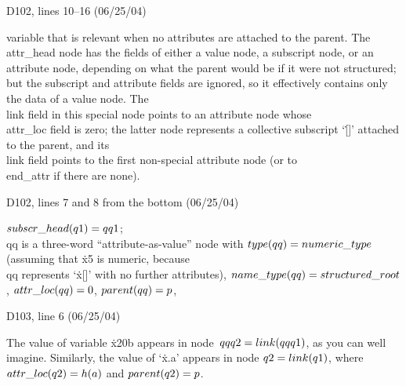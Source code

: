 {{\bugonpage D102, lines 10--16 (06/25/04)

\noindent
variable that is relevant
when no attributes are attached to the parent. The \\{attr\_head} node
has the fields of either
a value node, a subscript node, or an attribute node, depending on what
the parent would be if it were not structured; but the subscript and
attribute fields are ignored, so it effectively contains only the data of
a value node. The \\{link} field in this special node points to an attribute
node whose \\{attr\_loc} field is zero; the latter node represents a collective
subscript `\.{[]}' attached to the parent, and its \\{link} field points to
the first non-special attribute node (or to \\{end\_attr} if there are none).

\bugonpage D102, lines 7 and 8 from the bottom (06/25/04)

\noindent
$\\{subscr\_head}(\\{q1})=\\{qq1}$;
\\{qq} is a three-word ``attribute-as-value'' node with
$\\{type}(\\{qq})=\break\\{numeric\_type}$
(assuming that \.{x5} is numeric, because \\{qq} represents `\.{x[]}'
with no further\break
 attributes), $\\{name\_type}(\\{qq})=\\{structured\_root}$,
$\\{attr\_loc}(\\{qq})=0$, $\\{parent}(\\{qq})=p$,\cutpar

\bugonpage D103, line 6 (06/25/04)

\noindent
The value of variable \.{x20b}
appears in node~$\\{qqq2}=\\{link}(\\{qqq1})$, as you can well imagine.
Similarly, the value of `\.{x.a}' appears in node $\\{q2}=\\{link}(\\{q1})$,
where $\\{attr\_loc}(\\{q2})=h(a)$ and $\\{parent}(\\{q2})=p$.

}}
